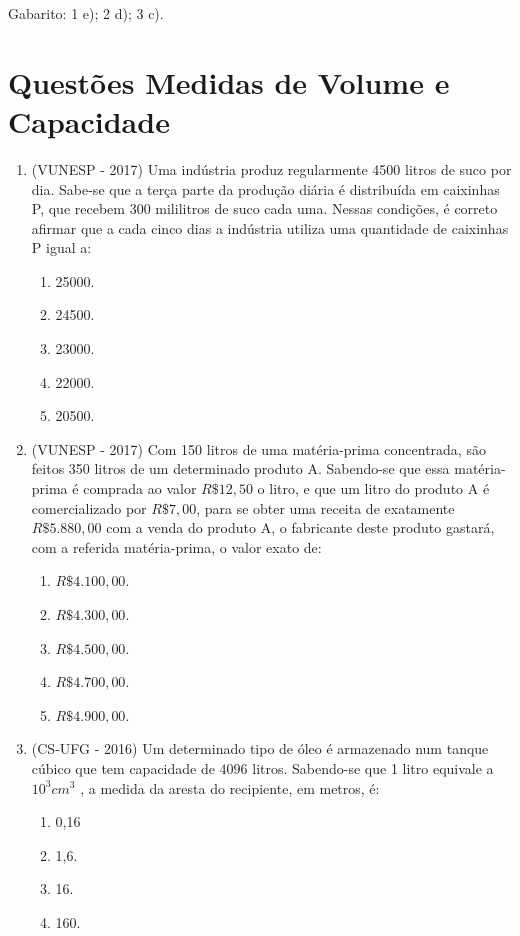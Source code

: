 Gabarito: 1 e); 2 d); 3 c).
 

\section{Questões Medidas de Volume e Capacidade}

\begin{enumerate}[1)]
 \item (VUNESP - 2017) Uma indústria produz regularmente 4500 litros de suco por dia. Sabe-se que a terça parte da produção diária é distribuída em caixinhas P, que recebem 300 mililitros de suco cada uma. Nessas condições, é correto afirmar que a cada cinco dias a indústria utiliza uma quantidade de caixinhas P igual a:
 \begin{enumerate}
 \item 25000.
 \item 24500.
 \item 23000.
 \item 22000.
 \item 20500.
 \end{enumerate}
 
 \item (VUNESP - 2017) Com 150 litros de uma matéria-prima concentrada, são feitos 350 litros de um determinado produto A. Sabendo-se que essa matéria-prima é comprada ao valor $R\$ 12,50$ o litro, e que um litro do produto A é comercializado por $R\$ 7,00$, para se obter uma receita de exatamente $R\$ 5.880,00$ com a venda do produto A, o fabricante deste produto gastará, com a referida matéria­-prima, o valor exato de:
 \begin{enumerate}
 \item $R\$ 4.100,00$.
 \item $R\$ 4.300,00$.
 \item $R\$ 4.500,00$.
 \item $R\$ 4.700,00$.
 \item $R\$ 4.900,00$.
 \end{enumerate}
 
 \item (CS-UFG - 2016) Um determinado tipo de óleo é armazenado num tanque cúbico que tem capacidade de $4 096$ litros. Sabendo-se que 1 litro equivale a $10^3 cm^3$ , a medida da aresta do recipiente, em metros, é:
\begin{enumerate}
 \item 0,16
 \item 1,6.
 \item 16.
 \item 160.
\end{enumerate}
 

\end{enumerate}
